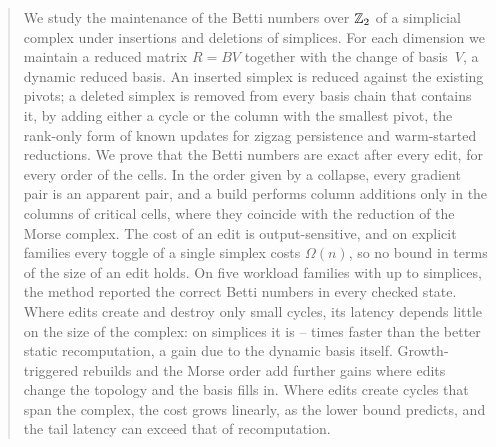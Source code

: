 \begin{abstract}
We study the maintenance of the Betti numbers over $\Z$ of a simplicial complex
under insertions and deletions of simplices. For each dimension we maintain a
reduced matrix $R=BV$ together with the change of basis~$V$, a dynamic reduced
basis. An inserted simplex is reduced against the existing pivots; a deleted
simplex is removed from every basis chain that contains it, by adding either a
cycle or the column with the smallest pivot, the rank-only form of known updates
for zigzag persistence and warm-started reductions. We prove that the Betti
numbers are exact after every edit, for every order of the cells. In the order
given by a collapse, every gradient pair is an apparent pair, and a build
performs column additions only in the columns of critical cells, where they
coincide with the reduction of the Morse complex. The cost of an edit is
output-sensitive, and on explicit families every toggle of a single simplex
costs $\Omega(n)$, so no bound in terms of the size of an edit holds. On five
workload families with up to \NumSizeMax{} simplices, the method reported the
correct Betti numbers in every checked state. Where edits create and destroy
only small cycles, its latency depends little on the size of the complex: on
\NumWTwoNThirtyThreeSEightSize{} simplices it is
\NumMainWTwoLargestSpeedupMin--\NumMainWTwoLargestSpeedupMax{} times faster than
the better static recomputation, a gain due to the dynamic basis itself.
Growth-triggered rebuilds and the Morse order add further gains where edits
change the topology and the basis fills in. Where edits create cycles that span
the complex, the cost grows linearly, as the lower bound predicts, and the tail
latency can exceed that of recomputation.
\end{abstract}
